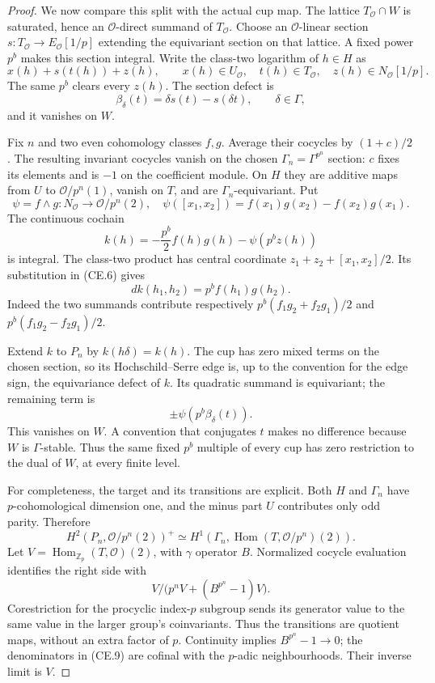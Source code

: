 \begin{proof}
We now compare this split with the actual cup map. The lattice
$T_{\mathcal O}\cap W$ is saturated, hence an $\mathcal O$-direct
summand of $T_{\mathcal O}$. Choose an $\mathcal O$-linear section
$s:T_{\mathcal O}\to E_{\mathcal O}[1/p]$ extending the equivariant
section on that lattice. A fixed power $p^b$ makes this section
integral. Write the class-two logarithm of $h\in H$ as
\[
 x(h)+s(t(h))+z(h),\qquad
 x(h)\in U_{\mathcal O},\quad t(h)\in T_{\mathcal O},\quad
 z(h)\in N_{\mathcal O}[1/p].
\]
The same $p^b$ clears every $z(h)$. The section defect is
\[
 \beta_\delta(t)=\delta s(t)-s(\delta t),\qquad\delta\in\Gamma,
                                                               \tag{CE.5}
\]
and it vanishes on $W$.

Fix $n$ and two even cohomology classes $f,g$. Average their cocycles
by $(1+c)/2$. The resulting invariant cocycles vanish on the chosen
$\Gamma_n=\Gamma^{p^n}$ section: $c$ fixes its elements and is
$-1$ on the coefficient module. On $H$ they are additive maps
from $U$ to $\mathcal O/p^n(1)$, vanish on $T$, and are
$\Gamma_n$-equivariant. Put
\[
 \psi=f\wedge g:N_{\mathcal O}\longrightarrow\mathcal O/p^n(2),
 \quad
 \psi([x_1,x_2])=f(x_1)g(x_2)-f(x_2)g(x_1).
\]
The continuous cochain
\[
 k(h)=-\frac{p^b}{2}f(h)g(h)-\psi(p^b z(h))                    \tag{CE.6}
\]
is integral. The class-two product has central coordinate
$z_1+z_2+[x_1,x_2]/2$. Its substitution in (CE.6) gives
\[
 dk(h_1,h_2)=p^b f(h_1)g(h_2).
\]
Indeed the two summands contribute respectively
$p^b(f_1g_2+f_2g_1)/2$ and $p^b(f_1g_2-f_2g_1)/2$.

Extend $k$ to $P_n$ by $k(h\delta)=k(h)$. The cup has zero mixed
terms on the chosen section, so its Hochschild--Serre edge is, up
to the convention for the edge sign, the equivariance defect of
$k$. Its quadratic summand is equivariant; the remaining term is
\[
 \pm\psi(p^b\beta_\delta(t)).                               \tag{CE.7}
\]
This vanishes on $W$. A convention that conjugates $t$ makes no
difference because $W$ is $\Gamma$-stable. Thus the same fixed
$p^b$ multiple of every cup has zero restriction to the dual of
$W$, at every finite level.

For completeness, the target and its transitions are explicit.
Both $H$ and $\Gamma_n$ have $p$-cohomological dimension one,
and the minus part $U$ contributes only odd parity. Therefore
\[
 H^2(P_n,\mathcal O/p^n(2))^+
 \simeq H^1(\Gamma_n,\operatorname{Hom}(T,\mathcal O/p^n)(2)).
                                                               \tag{CE.8}
\]
Let $V=\operatorname{Hom}_{\mathbb Z_p}(T,\mathcal O)(2)$, with
$\gamma$ operator $B$. Normalized cocycle evaluation identifies
the right side with
\[
 V\big/\bigl(p^nV+(B^{p^n}-1)V\bigr).                         \tag{CE.9}
\]
Corestriction for the procyclic index-$p$ subgroup sends its
generator value to the same value in the larger group's
coinvariants. Thus the transitions are quotient maps, without an
extra factor of $p$. Continuity implies $B^{p^n}-1\to0$; the
denominators in (CE.9) are cofinal with the $p$-adic neighbourhoods.
Their inverse limit is $V$.


\end{proof}
